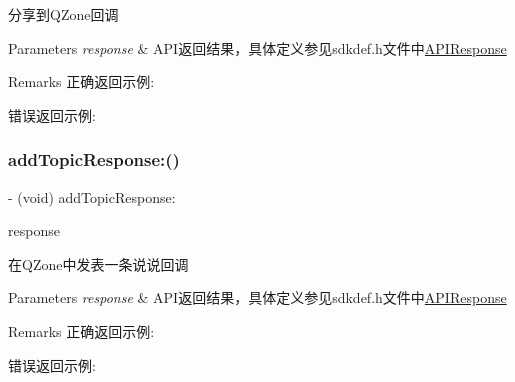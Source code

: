 分享到\+Q\+Zone回调 
\begin{DoxyParams}{Parameters}
{\em response} & A\+P\+I返回结果，具体定义参见sdkdef.\+h文件中\mbox{\hyperlink{interface_a_p_i_response}{A\+P\+I\+Response}} \\
\hline
\end{DoxyParams}
\begin{DoxyRemark}{Remarks}
正确返回示例\+: 
\begin{DoxyCodeInclude}
\end{DoxyCodeInclude}
 错误返回示例\+: 
\begin{DoxyCodeInclude}
\end{DoxyCodeInclude}

\end{DoxyRemark}
\mbox{\label{protocol_tencent_session_delegate-p_a708d12ee5e08e418428f834b9e7aefd6}} 
\subsubsection{\texorpdfstring{add\+Topic\+Response\+:()}{addTopicResponse:()}\hspace{0.1cm}{\footnotesize\ttfamily [1/2]}}
{\footnotesize\ttfamily -\/ (void) add\+Topic\+Response\+: \begin{DoxyParamCaption}\item[{(\mbox{\hyperlink{interface_a_p_i_response}{A\+P\+I\+Response}} $\ast$)}]{response }\end{DoxyParamCaption}\hspace{0.3cm}{\ttfamily [optional]}}

在\+Q\+Zone中发表一条说说回调 
\begin{DoxyParams}{Parameters}
{\em response} & A\+P\+I返回结果，具体定义参见sdkdef.\+h文件中\mbox{\hyperlink{interface_a_p_i_response}{A\+P\+I\+Response}} \\
\hline
\end{DoxyParams}
\begin{DoxyRemark}{Remarks}
正确返回示例\+: 
\begin{DoxyCodeInclude}
\end{DoxyCodeInclude}
 错误返回示例\+: 
\begin{DoxyCodeInclude}
\end{DoxyCodeInclude}

\end{DoxyRemark}
\mbox{\label{protocol_tencent_session_delegate-p_a708d12ee5e08e418428f834b9e7aefd6}} 
